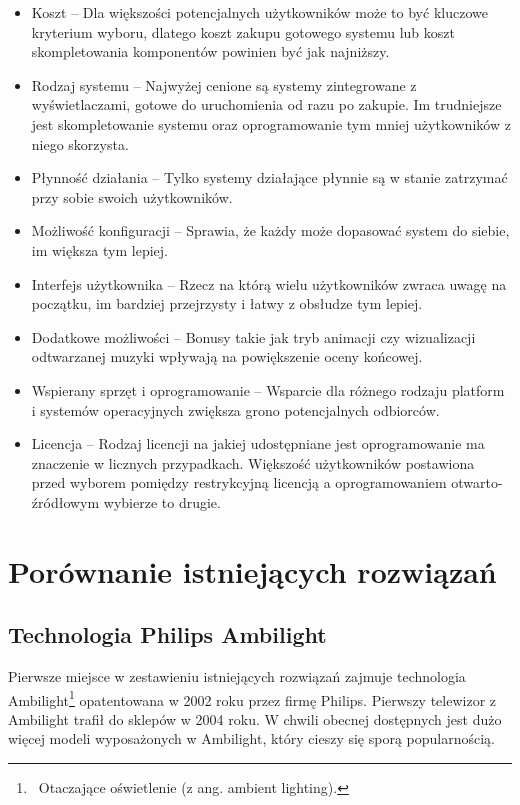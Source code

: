 \documentclass[12pt]{report}
\begin{document}
\begin{itemize}
	\item Koszt -- Dla większości potencjalnych użytkowników może to być kluczowe kryterium wyboru, dlatego koszt zakupu gotowego systemu lub koszt skompletowania komponentów powinien być jak najniższy.
	\item Rodzaj systemu -- Najwyżej cenione są systemy zintegrowane z wyświetlaczami, gotowe do uruchomienia od razu po zakupie. Im trudniejsze jest skompletowanie systemu oraz oprogramowanie tym mniej użytkowników z niego skorzysta.
	\item Płynność działania -- Tylko systemy działające płynnie są w stanie zatrzymać przy sobie swoich użytkowników.
	\item Możliwość konfiguracji -- Sprawia, że każdy może dopasować system do siebie, im większa tym lepiej.
	\item Interfejs użytkownika -- Rzecz na którą wielu użytkowników zwraca uwagę na początku, im bardziej przejrzysty i łatwy z obsłudze tym lepiej.
	\item Dodatkowe możliwości -- Bonusy takie jak tryb animacji czy wizualizacji odtwarzanej muzyki wpływają na powiększenie oceny końcowej.
	\item Wspierany sprzęt i oprogramowanie -- Wsparcie dla różnego rodzaju platform i systemów operacyjnych zwiększa grono potencjalnych odbiorców.
	\item Licencja -- Rodzaj licencji na jakiej udostępniane jest oprogramowanie ma znaczenie w licznych przypadkach. Większość użytkowników postawiona przed wyborem pomiędzy restrykcyjną licencją a oprogramowaniem otwarto-źródłowym wybierze to drugie.
\end{itemize} 

\section{Porównanie istniejących rozwiązań}

\subsection{Technologia Philips Ambilight}

Pierwsze miejsce w zestawieniu istniejących rozwiązań zajmuje technologia Ambilight\footnote{~Otaczające oświetlenie (z ang. ambient lighting).} opatentowana w 2002 roku przez firmę Philips. Pierwszy telewizor z Ambilight trafił do sklepów w 2004 roku. W chwili obecnej dostępnych jest dużo więcej modeli wyposażonych w Ambilight, który cieszy się sporą popularnością.
\end{document}
